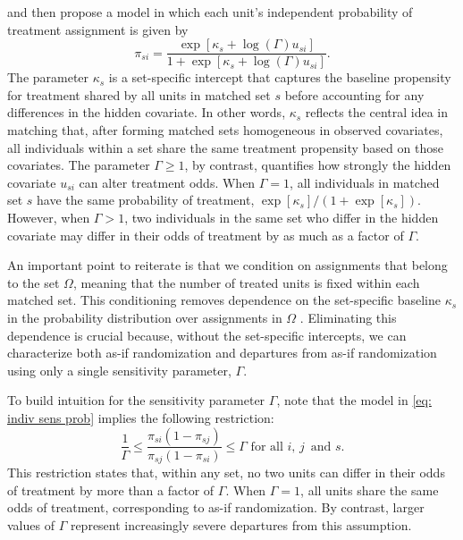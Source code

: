 \documentclass[
  12pt,
  leqno]{article}
\begin{document}
\citet{rosenbaum1987a} and \citet{rosenbaumkrieger1990} then propose a
model in which each unit's independent probability of treatment
assignment is given by \begin{equation}
\label{eq: indiv sens prob}
\pi_{si} = \frac{\exp\left[\kappa_s + \log(\Gamma) u_{si}\right]}{1 + \exp\left[\kappa_s + \log(\Gamma) u_{si}\right]}.
\end{equation} The parameter \(\kappa_s\) is a set-specific intercept
that captures the baseline propensity for treatment shared by all units
in matched set \(s\) before accounting for any differences in the hidden
covariate. In other words, \(\kappa_s\) reflects the central idea in
matching that, after forming matched sets homogeneous in observed
covariates, all individuals within a set share the same treatment
propensity based on those covariates. The parameter \(\Gamma \geq 1\),
by contrast, quantifies how strongly the hidden covariate \(u_{si}\) can
alter treatment odds. When \(\Gamma = 1\), all individuals in matched
set \(s\) have the same probability of treatment,
\(\exp[\kappa_s] / (1 + \exp[\kappa_s])\). However, when \(\Gamma > 1\),
two individuals in the same set who differ in the hidden covariate may
differ in their odds of treatment by as much as a factor of \(\Gamma\).

An important point to reiterate is that we condition on assignments that
belong to the set \(\Omega\), meaning that the number of treated units
is fixed within each matched set. This conditioning removes dependence
on the set-specific baseline \(\kappa_s\) in the probability
distribution over assignments in \(\Omega\)
\citep{rosenbaum1984, rosenbaumkrieger1990}. Eliminating this dependence
is crucial because, without the set-specific intercepts, we can
characterize both as-if randomization and departures from as-if
randomization using only a single sensitivity parameter, \(\Gamma\).

To build intuition for the sensitivity parameter \(\Gamma\), note that
the model in \eqref{eq: indiv sens prob} implies the following
restriction: \begin{equation} \label{eq: odds ratio restrict}
\frac{1}{\Gamma} \leq \frac{\pi_{si}\left(1 - \pi_{sj}\right)}{\pi_{sj}\left(1 - \pi_{si}\right)} \leq \Gamma \text{ for all } i, \, j \, \text{ and } s.
\end{equation} This restriction states that, within any set, no two
units can differ in their odds of treatment by more than a factor of
\(\Gamma\). When \(\Gamma = 1\), all units share the same odds of
treatment, corresponding to as-if randomization. By contrast, larger
values of \(\Gamma\) represent increasingly severe departures from this
assumption.
\end{document}
